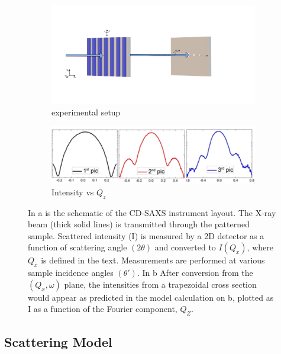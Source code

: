\begin{figure}[h]
    \centering
    \begin{subfigure}[b]{0.8\textwidth}
        \includegraphics[width=\textwidth]{images/cdsaxs_diff.png}
        \caption{experimental setup}
        \label{fig:exp_setup}
    \end{subfigure}
    
    \begin{subfigure}[b]{0.4\textwidth}
        \includegraphics[width=\textwidth]{images/intensity_qz.png}
        \caption{Intensity vs $Q_z$}
    \end{subfigure}
    
    \caption{In a is the schematic of the CD-SAXS instrument layout. The X-ray beam (thick solid lines) is transmitted through the 
    patterned sample. Scattered intensity (I) is measured by a 2D detector as a function of scattering angle $(2\theta)$ 
    and converted to $I(Q_{x})$, where $Q_{x}$ is defined in the text. Measurements are performed at various sample incidence 
    angles $(\theta')$. In b After conversion from the $(Q_{x},\omega)$
    plane, the intensities
   from a trapezoidal cross section would appear as predicted in
   the model calculation on b, plotted as I as a function of the
   Fourier component, $Q_{Z}$.}
   \label{fig:isolated_line}
\end{figure}

\FloatBarrier

\subsection{Scattering Model} \label{sec:scattering_model}

